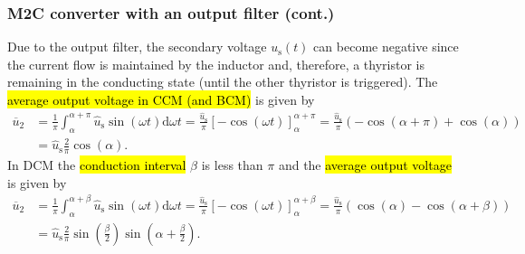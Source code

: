 \begin{frame}[c]
    \frametitle{M2C converter with an output filter (cont.)}
    Due to the output filter, the secondary voltage $u_\mathrm{s}(t)$ can become negative since the current flow is maintained by the inductor and, therefore, a thyristor is remaining in the conducting state (until the other thyristor is triggered). The \hl{average output voltage in CCM (and BCM)} is given by
    \begin{equation}
        \begin{split}
            \overline{u}_2 &= \frac{1}{\pi} \int_{\alpha}^{\alpha+\pi} \hat{u}_\mathrm{s} \sin(\omega t) \mathrm{d} \omega t = \frac{\hat{u}_\mathrm{s}}{\pi} \left[ -\cos(\omega t) \right]_{\alpha}^{\alpha+\pi} = \frac{\hat{u}_\mathrm{s}}{\pi} \left(-\cos(\alpha+\pi) +\cos(\alpha)\right)\\
             &= \hat{u}_\mathrm{s}\frac{2}{\pi} \cos(\alpha).
        \end{split}
        \label{eq:u2_avg_M2C_CCM}
    \end{equation}
    In DCM the \hl{conduction interval} $\beta$ is less than $\pi$ and the \hl{average output voltage} is given by
    \begin{equation}
        \begin{split}
        \overline{u}_2 &= \frac{1}{\pi} \int_{\alpha}^{\alpha+\beta} \hat{u}_\mathrm{s} \sin(\omega t) \mathrm{d} \omega t = \frac{\hat{u}_\mathrm{s}}{\pi} \left[ -\cos(\omega t) \right]_{\alpha}^{\alpha+\beta} = \frac{\hat{u}_\mathrm{s}}{\pi} \left(\cos(\alpha)-\cos(\alpha+\beta)\right)\\
                       &= \hat{u}_\mathrm{s}\frac{2}{\pi}\sin\left(\frac{\beta}{2}\right)\sin\left(\alpha + \frac{\beta}{2}\right).
    \end{split}
    \end{equation}
\end{frame}

